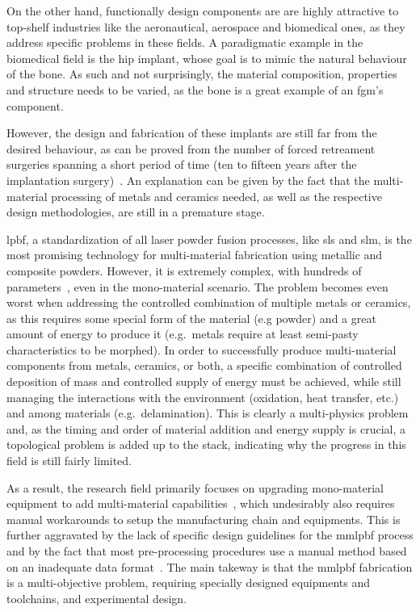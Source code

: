 On the other hand, functionally design components are are highly attractive to top-shelf industries like
the aeronautical, aerospace and biomedical ones, as they address specific
problems in these fields. 
A paradigmatic example in the
biomedical field is the hip implant, whose goal is to mimic the natural
behaviour of the bone. As such and not surprisingly, the material composition,
properties and structure needs to be varied, as the bone is a great example of
an \gls{fgm}'s component.

However, the design and fabrication of these implants are still far
from the desired behaviour, as can be proved from the number of forced
retreament surgeries spanning a short period of time (ten to fifteen years after
the implantation surgery)~\cite{soliman2022review}.
An explanation can be given by the fact that
the multi-material processing of metals and ceramics needed, as well as the
respective design methodologies, are still in a premature stage.

\gls{lpbf}, a standardization of all laser powder fusion processes, like
\gls{sls} and \gls{slm}, is the most promising technology for multi-material
fabrication using metallic and composite powders. However, it is extremely complex, with hundreds of parameters~\cite{schneck2021review,
  thompson2015overview}, even in the mono-material scenario.
The problem becomes even worst when addressing the controlled combination of
multiple metals or ceramics, as this requires some special form of the material
(e.g powder) and a great amount of energy to produce it (e.g.~metals require at
least semi-pasty characteristics to be morphed). In order to successfully
produce multi-material components from metals, ceramics, or both, a specific
combination of controlled deposition of mass and controlled supply of energy
must be achieved, while still managing the interactions with the environment
(oxidation, heat transfer, etc.) and among materials (e.g.~delamination). This
is clearly a multi-physics problem and, as the timing and order of material
addition and energy supply is crucial, a topological problem is added up to the
stack, indicating why the progress in this field is still fairly limited.

As a result, the research field primarily focuses on upgrading mono-material
equipment to add multi-material capabilities~\cite{bareth2022Implem, schneck2022capability,
  nadimpali2019MMSteels, anstaett2017fabrication, sing2015interfacial,
  liu2014interfacial},  which undesirably also requires manual workarounds to
setup the manufacturing chain and equipments.
This is further aggravated by the lack of specific design guidelines for the 
\gls{mmlpbf} process and by the fact that most pre-processing procedures use a
manual method based on an inadequate data format~\cite{schneck2021review}.
%
The main takeway is that the \gls{mmlpbf} fabrication is a multi-objective
problem, requiring specially designed equipments and toolchains, and
experimental design.

